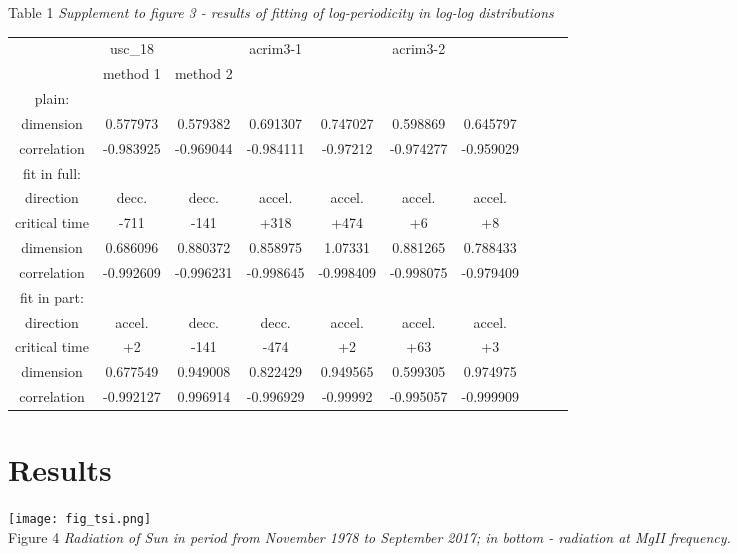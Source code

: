 \documentclass[a4paper]{article}
\begin{document}
Table 1 \textit{Supplement to figure 3 - results of fitting of log-periodicity in log-log distributions}
\vskip 12pt
\begin{tabular}{cccccccccc}
\hline
             & usc\_18        &           & acrim3-1  &           & acrim3-2  &           \\
             & method 1       & method 2  &           &           &           &           \\
\hline
plain: \\
dimension     & 0.577973  & 0.579382  & 0.691307  & 0.747027  & 0.598869  & 0.645797  \\
correlation   & -0.983925 & -0.969044 & -0.984111 & -0.97212  & -0.974277 & -0.959029 \\
\hline
fit in full: \\ 
direction     & decc.     & decc.     & accel.    & accel.    & accel.    & accel.    \\
critical time & -711      & -141      & +318      & +474      & +6        & +8        \\
dimension     & 0.686096  & 0.880372  & 0.858975  & 1.07331   & 0.881265  & 0.788433  \\
correlation   & -0.992609 & -0.996231 & -0.998645 & -0.998409 & -0.998075 & -0.979409 \\
\hline
fit in part: \\
direction     & accel.    & decc.     & decc.     & accel.    & accel.    & accel.    \\
critical time & +2        & -141      & -474      & +2        & +63       & +3        \\
dimension     & 0.677549  & 0.949008  & 0.822429  & 0.949565  & 0.599305  & 0.974975  \\
correlation   & -0.992127 & 0.996914  & -0.996929 & -0.99992  & -0.995057 & -0.999909 \\
\hline
\end{tabular}

\newpage
\section*{Results}

\texttt{[image: fig\_tsi.png]}\\
\vskip 12pt
Figure 4 \textit{Radiation of Sun in period from November 1978 to September 2017; in bottom - radiation at MgII frequency. }
\end{document}
